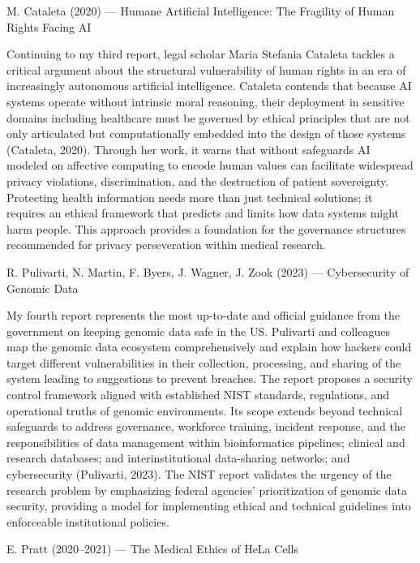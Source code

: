 \documentclass[12pt]{article}
\begin{document}
M. Cataleta (2020) — Humane Artificial Intelligence: The Fragility of Human Rights Facing AI

Continuing to my third report, legal scholar Maria Stefania Cataleta tackles a critical argument about the structural vulnerability of human rights in an era of increasingly autonomous artificial intelligence. Cataleta contends that because AI systems operate without intrinsic moral reasoning, their deployment in sensitive domains including healthcare must be governed by ethical principles that are not only articulated but computationally embedded into the design of those systems (Cataleta, 2020). Through her work, it warns that without safeguards AI modeled on affective computing to encode human values can facilitate widespread privacy violations, discrimination, and the destruction of patient sovereignty. Protecting health information needs more than just technical solutions; it requires an ethical framework that predicts and limits how data systems might harm people. This approach provides a foundation for the governance structures recommended for privacy perseveration within medical research.

R. Pulivarti, N. Martin, F. Byers, J. Wagner, J. Zook (2023) — Cybersecurity of Genomic Data 

My fourth report represents the most up-to-date and official guidance from the government on keeping genomic data safe in the US. Pulivarti and colleagues map the genomic data ecosystem comprehensively and explain how hackers could target different vulnerabilities in their collection, processing, and sharing of the system leading to suggestions to prevent breaches. The report proposes a security control framework aligned with established NIST standards, regulations, and operational truths of genomic environments. Its scope extends beyond technical safeguards to address governance, workforce training, incident response, and the responsibilities of data management within bioinformatics pipelines; clinical and research databases; and interinstitutional data-sharing networks; and cybersecurity (Pulivarti, 2023). The NIST report validates the urgency of the research problem by emphasizing federal agencies' prioritization of genomic data security, providing a model for implementing ethical and technical guidelines into enforceable institutional policies.

E. Pratt (2020–2021) — The Medical Ethics of HeLa Cells
\end{document}
